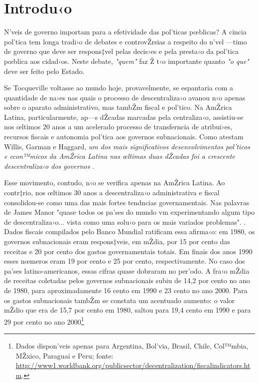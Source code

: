 \documentclass[a4paper, 12pt]{article}
\begin{document}
\pagebreak


\renewcommand{\thefootnote}{\arabic{footnote}} \setcounter{footnote}{0}
\setcounter{page}{15}
\doublespacing

\section{Introdu‹o}

N’veis de governo importam para a efetividade das pol’ticas pœblicas? A cincia pol’tica tem longa tradi‹o de debates e controvŽrsias a respeito do n’vel —timo de governo que deve ser respons‡vel pelas decis›es e pela presta‹o da pol’tica pœblica aos cidad‹os. Neste debate, \emph{"quem"} faz Ž t‹o importante quanto \emph{"o que"} deve ser feito pelo Estado. 

Se Tocqueville voltasse ao mundo hoje, provavelmente, se espantaria com a quantidade de na›es nas quais o processo de descentraliza‹o avanou n‹o apenas sobre o aparato administrativo, mas tambŽm fiscal e pol’tico. Na AmŽrica Latina, particularmente, ap—s dŽcadas marcadas pela centraliza‹o, assistiu-se nos œltimos 20 anos a um acelerado processo de transferncia de atribui›es, recursos fiscais e autonomia pol’tica aos governos subnacionais. Como atestam Willis, Garman e Haggard, \emph{um dos mais significativos desenvolvimentos pol’ticos e econ™micos da AmŽrica Latina nas œltimas duas dŽcadas foi a crescente descentraliza‹o dos governos} \citeyear{willis_politics_1999}. 

Esse movimento, contudo, n‹o se verifica apenas  na AmŽrica Latina. Ao contr‡rio, nos œltimos 30 anos a descentraliza‹o administrativa e fiscal consolidou-se como uma das mais fortes tendncias governamentais. Nas palavras de James Manor "quase todos os pa’ses do mundo vm experimentando algum tipo de descentraliza‹o... vista como uma solu‹o para os mais variados problemas". \citeyear{manor_political_1999}. Dados fiscais compilados pelo Banco Mundial ratificam essa afirma‹o: em 1980, os governos subnacionais eram respons‡veis, em mŽdia, por 15 por cento das receitas e 20 por cento dos gastos governamentais totais. Em finais dos anos 1990 esses nœmeros eram 19 por cento e 25 por cento, respectivamente. No caso dos pa’ses latino-americanos, essas cifras quase dobraram no per’odo. A fra‹o mŽdia de receitas coletadas pelos governos subnacionais subiu de 14,2 por cento no ano de 1980, para aproximadamente 16 cento em 1990 e 23 cento no ano 2000. Para os gastos subnacionais tambŽm se constata um acentuado aumento: o valor mŽdio que era de 15,7 por cento em 1980, saltou para 19,4 cento em 1990 e para 29 por cento no ano 2000\footnote{Dados dispon’veis apenas para Argentina, Bol’via, Brasil, Chile, Col™mbia, MŽxico, Paraguai e Peru; fonte: \url{http://www1.worldbank.org/publicsector/decentralization/fiscalindicators.htm}.}
\end{document}
